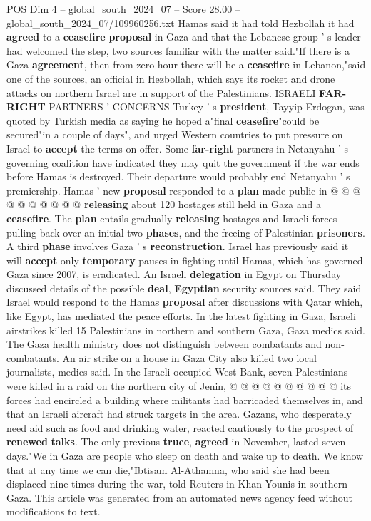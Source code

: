 \begin{textsample}{POS Dim 4 – global\_south\_2024\_07 – Score 28.00 – global\_south\_2024\_07/109960256.txt}
Hamas said it had told Hezbollah it had \textbf{agreed} to a \textbf{ceasefire} \textbf{proposal} in Gaza and that the Lebanese group ' s leader had welcomed the step, two sources familiar with the matter said."If there is a Gaza \textbf{agreement}, then from zero hour there will be a \textbf{ceasefire} in Lebanon,"said one of the sources, an official in Hezbollah, which says its rocket and drone attacks on northern Israel are in support of the Palestinians.
ISRAELI \textbf{FAR-RIGHT} PARTNERS ' CONCERNS Turkey ' s \textbf{president}, Tayyip Erdogan, was quoted by Turkish media as saying he hoped a"final \textbf{ceasefire}"could be secured"in a couple of days", and urged Western countries to put pressure on Israel to \textbf{accept} the terms on offer.
Some \textbf{far-right} partners in Netanyahu ' s governing coalition have indicated they may quit the government if the war ends before Hamas is destroyed.
Their departure would probably end Netanyahu ' s premiership.
Hamas ' new \textbf{proposal} responded to a \textbf{plan} made public in @ @ @ @ @ @ @ @ @ @ \textbf{releasing} about 120 hostages still held in Gaza and a \textbf{ceasefire}.
The \textbf{plan} entails gradually \textbf{releasing} hostages and Israeli forces pulling back over an initial two \textbf{phases}, and the freeing of Palestinian \textbf{prisoners}.
A third \textbf{phase} involves Gaza ' s \textbf{reconstruction}.
Israel has previously said it will \textbf{accept} only \textbf{temporary} pauses in fighting until Hamas, which has governed Gaza since 2007, is eradicated.
An Israeli \textbf{delegation} in Egypt on Thursday discussed details of the possible \textbf{deal}, \textbf{Egyptian} security sources said.
They said Israel would respond to the Hamas \textbf{proposal} after discussions with Qatar which, like Egypt, has mediated the peace efforts.
In the latest fighting in Gaza, Israeli airstrikes killed 15 Palestinians in northern and southern Gaza, Gaza medics said.
The Gaza health ministry does not distinguish between combatants and non-combatants.
An air strike on a house in Gaza City also killed two local journalists, medics said.
In the Israeli-occupied West Bank, seven Palestinians were killed in a raid on the northern city of Jenin, @ @ @ @ @ @ @ @ @ @ its forces had encircled a building where militants had barricaded themselves in, and that an Israeli aircraft had struck targets in the area.
Gazans, who desperately need aid such as food and drinking water, reacted cautiously to the prospect of \textbf{renewed} \textbf{talks}.
The only previous \textbf{truce}, \textbf{agreed} in November, lasted seven days."We in Gaza are people who sleep on death and wake up to death.
We know that at any time we can die,"Ibtisam Al-Athamna, who said she had been displaced nine times during the war, told Reuters in Khan Younis in southern Gaza.
This article was generated from an automated news agency feed without modifications to text.

\end{textsample}

